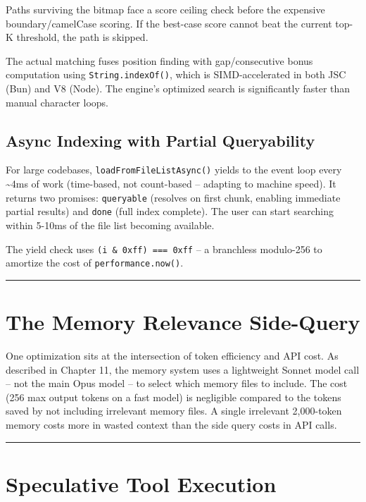 \documentclass[
  english,
  11pt,
  letterpaper,
]{book}
\begin{document}
Paths surviving the bitmap face a score ceiling check before the
expensive boundary/camelCase scoring. If the best-case score cannot beat
the current top-K threshold, the path is skipped.

The actual matching fuses position finding with gap/consecutive bonus
computation using \texttt{String.indexOf()}, which is SIMD-accelerated
in both JSC (Bun) and V8 (Node). The engine's optimized search is
significantly faster than manual character loops.

\subsection{Async Indexing with Partial
Queryability}\label{async-indexing-with-partial-queryability}

For large codebases, \texttt{loadFromFileListAsync()} yields to the
event loop every \textasciitilde4ms of work (time-based, not count-based
-- adapting to machine speed). It returns two promises:
\texttt{queryable} (resolves on first chunk, enabling immediate partial
results) and \texttt{done} (full index complete). The user can start
searching within 5-10ms of the file list becoming available.

The yield check uses \texttt{(i\ \&\ 0xff)\ ===\ 0xff} -- a branchless
modulo-256 to amortize the cost of \texttt{performance.now()}.

\begin{center}\rule{0.5\linewidth}{0.5pt}\end{center}

\section{The Memory Relevance
Side-Query}\label{the-memory-relevance-side-query}

One optimization sits at the intersection of token efficiency and API
cost. As described in Chapter 11, the memory system uses a lightweight
Sonnet model call -- not the main Opus model -- to select which memory
files to include. The cost (256 max output tokens on a fast model) is
negligible compared to the tokens saved by not including irrelevant
memory files. A single irrelevant 2,000-token memory costs more in
wasted context than the side query costs in API calls.

\begin{center}\rule{0.5\linewidth}{0.5pt}\end{center}

\section{Speculative Tool Execution}\label{speculative-tool-execution}
\end{document}
